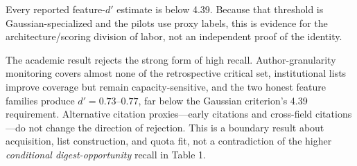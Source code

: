 \documentclass[
  conference,10pt]{IEEEtran}
\begin{document}
\begin{table}[t]
\centering
\footnotesize
\setlength{\tabcolsep}{3pt}
\caption{Table 2. Frozen real-corpus pilot calibers and boundary evidence.}
\end{table}

Every reported feature-\(d'\) estimate is below 4.39. Because that threshold is Gaussian-specialized and the pilots use proxy labels, this is evidence for the architecture/scoring division of labor, not an independent proof of the identity.

The academic result rejects the strong form of high recall. Author-granularity monitoring covers almost none of the retrospective critical set, institutional lists improve coverage but remain capacity-sensitive, and the two honest feature families produce \(d'=0.73\)--\(0.77\), far below the Gaussian criterion's 4.39 requirement. Alternative citation proxies---early citations and cross-field citations---do not change the direction of rejection. This is a boundary result about acquisition, list construction, and quota fit, not a contradiction of the higher \emph{conditional digest-opportunity} recall in Table 1.
\end{document}
